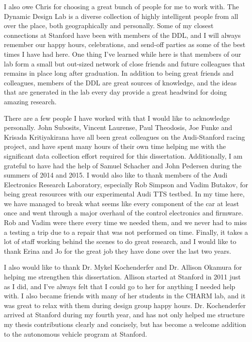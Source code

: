I also owe Chris for choosing a great bunch of people for me to work with. The Dynamic Design Lab is a diverse collection of highly intelligent
people from all over the place, both geographically and personally. Some of my closest connections at Stanford have been with members of the DDL, and
I will always remember our happy hours, celebrations, and send-off parties as some of the best times I have had here. 
One thing I've learned while here is that members of our lab form a small but out-sized network of close friends and future colleagues that remains in place long after graduation. 
 In addition to being great friends and colleagues, members of the DDL are great sources of knowledge, and the ideas that are generated in the lab every day provide a great headwind for
doing amazing research. 

There are a few people I have worked with that I would like to acknowledge personally. John Subosits, Vincent Laurense, Paul Theodosis, Joe Funke and Krisada Kritiyakirana have
all been great colleagues on the Audi-Stanford racing project, and have spent many hours of their own time helping me with the
significant data collection effort required for this dissertation. Additionally, I am grateful to have had the help of Samuel Schacher and John Pedersen during the summers
of 2014 and 2015. I would also like to thank members of the Audi Electronics Research Laboratory, especially Rob Simpson and Vadim Butakov, for being great resources with
 our experimental Audi TTS testbed. In my time here, we have managed to break what seems like every component of the car at least once and went through a major overhaul of the control
 electronics and firmware. Rob and Vadim were there every time we needed them, and we never had to miss a testing a trip due to a repair that was not performed on time. Finally,
 it takes a lot of staff working behind the scenes to do great research, and I would like to thank Erina and Jo for the great job they have done over the last two years.
 
I also would like to thank Dr. Mykel Kochenderfer and Dr. Allison Okamura for helping me strengthen this dissertation. Allison started at Stanford in 2011 just as I did, and I've always felt that I 
could go to her for anything I needed help with. I also became friends with many of her students in the CHARM lab, and it was great to relax with them
during design group happy hours. Dr. Kochenderfer arrived at Stanford during my fourth year, and has not only helped me structure my thesis contributions clearly
and concisely, but has become a welcome addition to the autonomous vehicle program at Stanford. 

